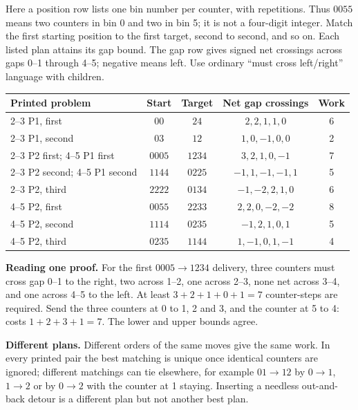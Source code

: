 \newpage
{}
Here a position row lists one bin number per counter, with repetitions. Thus $0055$ means two counters in bin 0 and two in bin 5; it is not a four-digit integer. Match the first starting position to the first target, second to second, and so on. Each listed plan attains its gap bound. The gap row gives signed net crossings across gaps 0--1 through 4--5; negative means left. Use ordinary ``must cross left/right'' language with children.

\begin{center}\small\renewcommand{\arraystretch}{1.35}
\begin{tabular}{p{4.0cm}c c c c}
Printed problem & Start & Target & Net gap crossings & Work\\\midrule
2--3 P1, first & $00$ & $24$ & $2,2,1,1,0$ & 6\\
2--3 P1, second & $03$ & $12$ & $1,0,-1,0,0$ & 2\\
2--3 P2 first; 4--5 P1 first & $0005$ & $1234$ & $3,2,1,0,-1$ & 7\\
2--3 P2 second; 4--5 P1 second & $1144$ & $0225$ & $-1,1,-1,-1,1$ & 5\\
2--3 P2, third & $2222$ & $0134$ & $-1,-2,2,1,0$ & 6\\
4--5 P2, first & $0055$ & $2233$ & $2,2,0,-2,-2$ & 8\\
4--5 P2, second & $1114$ & $0235$ & $-1,2,1,0,1$ & 5\\
4--5 P2, third & $0235$ & $1144$ & $1,-1,0,1,-1$ & 4\\\bottomrule
\end{tabular}\end{center}

\textbf{Reading one proof.} For the first $0005\to1234$ delivery, three counters must cross gap 0--1 to the right, two across 1--2, one across 2--3, none net across 3--4, and one across 4--5 to the left. At least $3+2+1+0+1=7$ counter-steps are required. Send the three counters at 0 to 1, 2 and 3, and the counter at 5 to 4: costs $1+2+3+1=7$. The lower and upper bounds agree.

\textbf{Different plans.} Different orders of the same moves give the same work. In every printed pair the best matching is unique once identical counters are ignored; different matchings can tie elsewhere, for example $01\to12$ by $0\to1$, $1\to2$ or by $0\to2$ with the counter at 1 staying. Inserting a needless out-and-back detour is a different plan but not another best plan.

